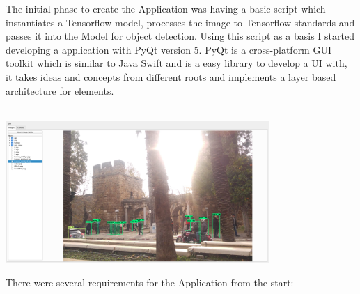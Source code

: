 

The initial phase to create the Application was having a basic script which instantiates a Tensorflow model, processes the image to
Tensorflow standards and passes it into the Model for object detection. Using this script as a basis I started developing a application with
PyQt version 5. PyQt is a cross-platform GUI toolkit which is similar to Java Swift and is a easy library to develop a UI with, it takes
ideas and concepts from different roots and implements a layer based architecture for elements. \\ \\
\begin{center}
    \includegraphics[width=0.75\textwidth]{images/application/Application.png}
\end{center}
There were several requirements for the Application from the start:
